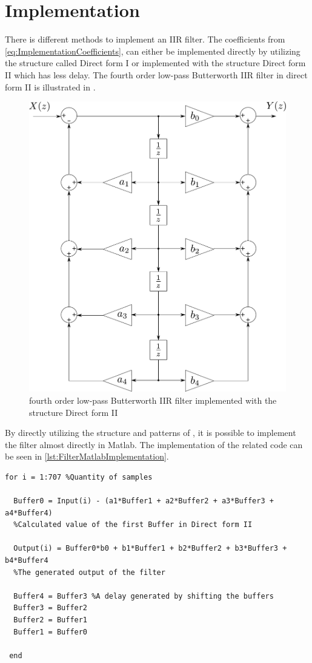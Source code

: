 \section{Implementation}
There is different methods to implement an IIR filter. The coefficients from \eqref{eq:ImplementationCoefficients}, can either be implemented directly by utilizing the structure called Direct form I or implemented with the structure Direct form II which has less delay. The fourth order low-pass Butterworth IIR filter in direct form II is illustrated in .
%
\begin{figure}[H]
	\centering
	\includegraphics[scale=0.4]{figures/IIRfilter.pdf}
	\caption{fourth order low-pass Butterworth IIR filter implemented with the structure Direct form II}
	\label{fig:IIRfilter}
\end{figure}
%
By directly utilizing the structure and patterns of , it is possible to implement the filter almost directly in Matlab. The implementation of the related code can be seen in \autoref{lst:FilterMatlabImplementation}.
%
\begin{lstlisting}
for i = 1:707 %Quantity of samples

  Buffer0 = Input(i) - (a1*Buffer1 + a2*Buffer2 + a3*Buffer3 + a4*Buffer4) 
  %Calculated value of the first Buffer in Direct form II
	
  Output(i) = Buffer0*b0 + b1*Buffer1 + b2*Buffer2 + b3*Buffer3 + b4*Buffer4 
  %The generated output of the filter
    	
  Buffer4 = Buffer3	%A delay generated by shifting the buffers
  Buffer3 = Buffer2
  Buffer2 = Buffer1
  Buffer1 = Buffer0
    
 end
\end{lstlisting}

